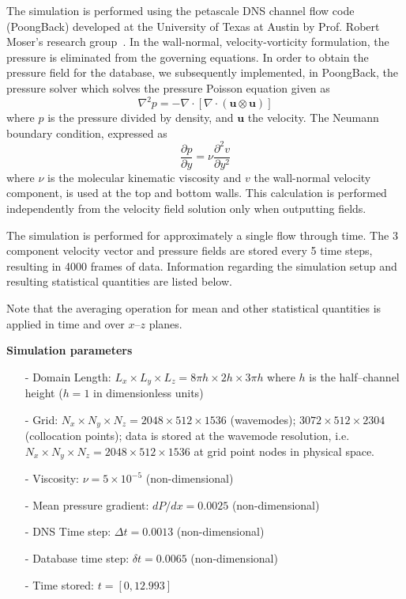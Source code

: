 \documentclass[11pt,letterpaper]{article}
\newcommand{\Div}[1] {\nabla \cdot #1}
\newcommand{\Lap}[1] {\nabla^2 #1}
\newcommand{\ppy}[1] {\frac{\partial #1}{\partial y}}
\newcommand{\ppyy}[1] {\frac{\partial^2 #1}{\partial y^2}}
\begin{document}
The simulation is performed using the petascale DNS channel flow code (PoongBack) developed at the University of Texas at Austin by Prof. Robert Moser's research group~\cite{Lee2013}. In the wall-normal, velocity-vorticity formulation, the pressure is eliminated from the governing equations. In order to obtain the pressure field for the database, we subsequently implemented, in PoongBack, the pressure solver which solves the pressure Poisson equation given as
\begin{equation}
  \Lap{p} = -\Div{\left[\Div{\left(\bm{u}\otimes\bm{u}\right)}\right]}
\end{equation}
where $p$ is the pressure divided by density, and $\bm{u}$ the velocity. The Neumann boundary condition, expressed as
\begin{equation}
  \ppy{p} = \nu \ppyy{v}
\end{equation}
where $\nu$ is the molecular kinematic viscosity and $v$ the wall-normal velocity component, is used at the top and bottom walls. This calculation is performed independently from the velocity field solution only when outputting fields.  

The simulation is performed for approximately a single flow through time. The 3 component velocity vector and pressure fields are stored every 5 time steps, resulting in 4000 frames of data. Information regarding the simulation setup and resulting statistical quantities are listed below. 

Note that the averaging operation for mean and other statistical quantities is applied in time and over $x$--$z$ planes.

\newpage
\noindent \textbf{Simulation parameters}
\begin{itemize}
\itemsep0em
\item[-] Domain Length: $L_x \times L_y \times L_z = 8\pi h \times 2h \times 3\pi h$ where $h$ is the half--channel height ($h=1$ in dimensionless units)
\item[-] Grid: $N_x \times N_y \times N_z = 2048 \times 512 \times 1536$ (wavemodes); $3072 \times 512 \times 2304$ (collocation points); data is stored at the wavemode resolution, i.e. $N_x \times N_y \times N_z = 2048 \times 512 \times 1536$ at grid point nodes in physical space.
\item[-] Viscosity: $\nu = 5\times 10^{-5}$ (non-dimensional)
\item[-] Mean pressure gradient: $dP/dx = 0.0025$ (non-dimensional)
\item[-] DNS Time step: $\Delta t = 0.0013$ (non-dimensional)
\item[-] Database time step: $\delta t = 0.0065$ (non-dimensional)
\item[-] Time stored: $t=[0,12.993]$
\end{itemize}
\end{document}

